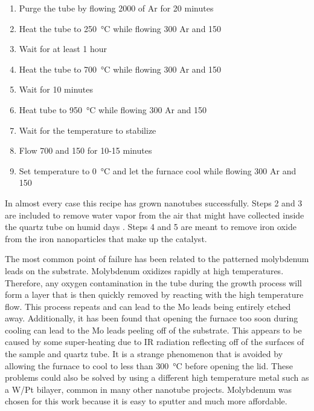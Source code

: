 \begin{enumerate}
	\item Purge the tube by flowing \SI{2000}{\sccm} of Ar for 20 minutes
	\item Heat the tube to \SI{250}{\degreeCelsius} while flowing \SI{300}{\sccm} Ar and \SI{150}{\sccm} 
	\item Wait for at least 1 hour
	\item Heat the tube to \SI{700}{\degreeCelsius} while flowing \SI{300}{\sccm} Ar and \SI{150}{\sccm} 
	\item Wait for 10 minutes
	\item Heat tube to \SI{950}{\degreeCelsius} while flowing \SI{300}{\sccm} Ar and \SI{150}{\sccm} 
	\item Wait for the temperature to stabilize
	\item Flow \SI{700}{\sccm}  and \SI{150}{\sccm}  for 10-15 minutes
	\item Set temperature to \SI{0}{\degreeCelsius} and let the furnace cool while flowing \SI{300}{\sccm} Ar and \SI{150}{\sccm} 
\end{enumerate}

In almost every case this recipe has grown nanotubes successfully. Steps 2 and 3 are included to remove water vapor from the air that might have collected inside the quartz tube on humid days \cite{Dirks2010}. Steps 4 and 5 are meant to remove iron oxide from the iron nanoparticles that make up the catalyst. 

The most common point of failure has been related to the patterned molybdenum leads on the substrate. Molybdenum oxidizes rapidly at high temperatures. Therefore, any oxygen contamination in the tube during the growth process will form a  layer that is then quickly removed by reacting with the high temperature  flow. This process repeats and can lead to the Mo leads being entirely etched away. Additionally, it has been found that opening the furnace too soon during cooling can lead to the Mo leads peeling off of the substrate. This appears to be caused by some super-heating due to IR radiation reflecting off of the surfaces of the sample and quartz tube. It is a strange phenomenon that is avoided by allowing the furnace to cool to less than \SI{300}{\degreeCelsius} before opening the lid. These problems could also be solved by using a different high temperature metal such as a W/Pt bilayer, common in many other nanotube projects. Molybdenum was chosen for this work because it is easy to sputter and much more affordable.

